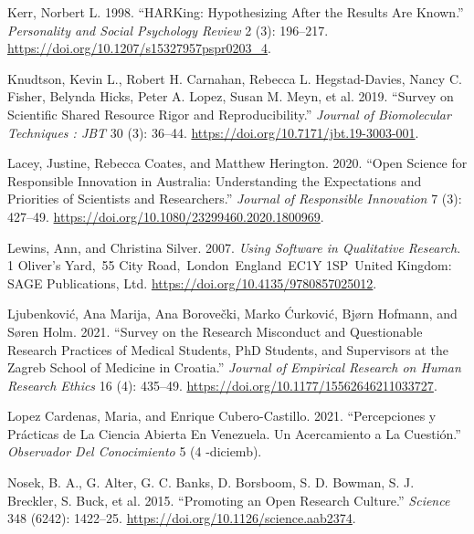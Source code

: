 \documentclass[
  letterpaper,
  DIV=11,
  numbers=noendperiod]{scrartcl}
\newlength{\cslhangindent}
\newlength{\cslentryspacingunit} %
\newenvironment{CSLReferences}[2] %
 {%
  \setlength{\parindent}{0pt}
  \ifodd #1
  \let\oldpar\par
  \def\par{\hangindent=\cslhangindent\oldpar}
  \fi
  \setlength{\parskip}{#2\cslentryspacingunit}
 }%
 {}
\begin{document}
\begin{CSLReferences}{1}{0}
\leavevmode{}%
Kerr, Norbert L. 1998. {``{HARKing}: {Hypothesizing After} the {Results}
Are {Known}.''} \emph{Personality and Social Psychology Review} 2 (3):
196--217. \url{https://doi.org/10.1207/s15327957pspr0203_4}.

\leavevmode{}%
Knudtson, Kevin L., Robert H. Carnahan, Rebecca L. Hegstad-Davies, Nancy
C. Fisher, Belynda Hicks, Peter A. Lopez, Susan M. Meyn, et al. 2019.
{``Survey on {Scientific Shared Resource Rigor} and
{Reproducibility}.''} \emph{Journal of Biomolecular Techniques : JBT} 30
(3): 36--44. \url{https://doi.org/10.7171/jbt.19-3003-001}.

\leavevmode{}%
Lacey, Justine, Rebecca Coates, and Matthew Herington. 2020. {``Open
Science for Responsible Innovation in {Australia}: {Understanding} the
Expectations and Priorities of Scientists and Researchers.''}
\emph{Journal of Responsible Innovation} 7 (3): 427--49.
\url{https://doi.org/10.1080/23299460.2020.1800969}.

\leavevmode{}%
Lewins, Ann, and Christina Silver. 2007. \emph{Using {Software} in
{Qualitative Research}}. 1 Oliver's Yard,~55 City
Road,~London~England~EC1Y 1SP~United Kingdom: SAGE Publications, Ltd.
\url{https://doi.org/10.4135/9780857025012}.

\leavevmode{}%
Ljubenković, Ana Marija, Ana Borovečki, Marko Ćurković, Bjørn Hofmann,
and Søren Holm. 2021. {``Survey on the {Research Misconduct} and
{Questionable Research Practices} of {Medical Students}, {PhD Students},
and {Supervisors} at the {Zagreb School} of {Medicine} in {Croatia}.''}
\emph{Journal of Empirical Research on Human Research Ethics} 16 (4):
435--49. \url{https://doi.org/10.1177/15562646211033727}.

\leavevmode{}%
Lopez Cardenas, Maria, and Enrique Cubero-Castillo. 2021.
{``Percepciones y Pr{á}cticas de La Ciencia Abierta En {Venezuela}. {Un}
Acercamiento a La Cuesti{ó}n.''} \emph{Observador Del Conocimiento} 5 (4
-diciemb).

\leavevmode{}%
Nosek, B. A., G. Alter, G. C. Banks, D. Borsboom, S. D. Bowman, S. J.
Breckler, S. Buck, et al. 2015. {``Promoting an Open Research
Culture.''} \emph{Science} 348 (6242): 1422--25.
\url{https://doi.org/10.1126/science.aab2374}.


\end{CSLReferences}
\end{document}
